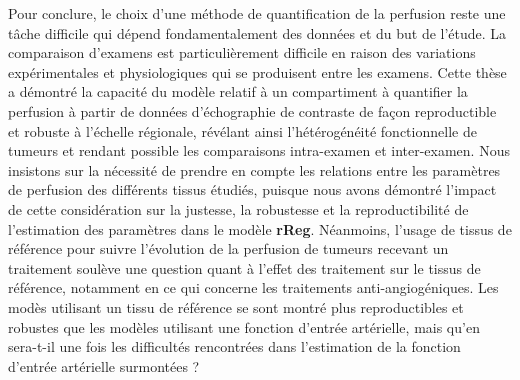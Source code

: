 \begin{otherlanguage}{francais}
Pour conclure, le choix d'une m\'ethode de quantification de la perfusion reste une t\^ache difficile qui d\'epend fondamentalement des donn\'ees et du but de l'\'etude.
La comparaison d'examens est particuli\`erement difficile en raison des variations exp\'erimentales et physiologiques qui se produisent entre les examens.
Cette th\`ese a d\'emontr\'e la capacit\'e du mod\`ele relatif \`a un compartiment \`a quantifier la perfusion \`a partir de donn\'ees d'\'echographie de contraste de fa\c{c}on reproductible et robuste \`a l'\'echelle r\'egionale, r\'ev\'elant ainsi l'h\'et\'erog\'en\'eit\'e fonctionnelle de tumeurs et rendant possible les comparaisons intra-examen et inter-examen.
Nous insistons sur la n\'ecessit\'e de prendre en compte les relations entre les param\`etres de perfusion des diff\'erents tissus \'etudi\'es, puisque nous avons d\'emontr\'e l'impact de cette consid\'eration sur la justesse, la robustesse et la reproductibilit\'e de l'estimation des param\`etres dans le mod\`ele \textbf{rReg}.
N\'eanmoins, l'usage de tissus de r\'ef\'erence pour suivre l'\'evolution de la perfusion de tumeurs recevant un traitement soul\`eve une question quant \`a l'effet des traitement sur le tissus de r\'ef\'erence, notamment en ce qui concerne les traitements anti-angiog\'eniques.
Les mod\`es utilisant un tissu de r\'ef\'erence se sont montr\'e plus reproductibles et robustes que les mod\`eles utilisant une fonction d'entr\'ee art\'erielle, mais qu'en sera-t-il une fois les difficult\'es rencontr\'ees dans l'estimation de la fonction d'entr\'ee art\'erielle surmont\'ees ?

\end{otherlanguage}